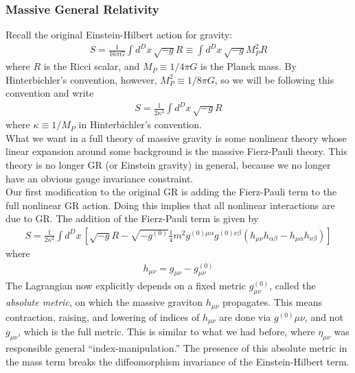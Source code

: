 \documentclass{book}
\theoremstyle{definition}
\newcommand{\f}[2]{\frac{#1}{#2}}
\newcommand{\lp}{\left(}
\newcommand{\rp}{\right)}
\newcommand{\lb}{\left[}
\newcommand{\rb}{\right]}
\begin{document}
\subsubsection{Massive General Relativity}



Recall the original Einstein-Hilbert action for gravity:
\begin{align}
S = \f{1}{16\pi G}\int d^Dx\, \sqrt{-g}R\equiv \int d^Dx\, \sqrt{-g}M_P^2R
\end{align}
where $R$ is the Ricci scalar, and $M_P \equiv 1/4\pi G$ is the Planck mass. By Hinterbichler's convention, however, $M_P^2 \equiv 1/8\pi G$, so we will be following this convention and write
\begin{align}
S = \f{1}{2\kappa^2}\int d^Dx\, \sqrt{-g}R
\end{align}
where $\kappa  \equiv 1/M_P$ in Hinterbichler's convention. \\

What we want in a full theory of massive gravity is some nonlinear theory whose linear expansion around some background is the massive Fierz-Pauli theory. This theory is no longer GR (or Einstein gravity) in general, because we no longer have an obvious gauge invariance constraint.\\

Our first modification to the original GR is adding the Fierz-Pauli term to the full nonlinear GR action. Doing this implies that all nonlinear interactions are due to GR. The addition of the Fierz-Pauli term is given by
\begin{align}\label{massive}
\boxed{S = \f{1}{2\kappa^2}\int d^Dx\, \lb \sqrt{-g}R - \sqrt{-g^{(0)}}\f{1}{4}m^2 g^{(0)\mu\alpha}g^{(0)\nu\beta}\lp h_{\mu\nu}h_{\alpha\beta} - h_{\mu\alpha}h_{\nu\beta} \rp \rb}
\end{align}
where 
\begin{align}
\boxed{h_{\mu\nu} = g_{\mu\nu} - g^{(0)}_{\mu\nu}}
\end{align}
The Lagrangian now explicitly depends on a fixed metric $g^{(0)}_{\mu\nu}$, called the \textit{absolute metric}, on which the massive graviton $h_{\mu\nu}$ propagates. This means contraction, raising, and lowering of indices of $h_{\mu\nu}$ are done via $g^{(0)}_{}\mu\nu$, and not $g_{\mu\nu}$, which is the full metric. This is similar to what we had before, where $\eta_{\mu\nu}$ was responsible general ``index-manipulation.'' The presence of this absolute metric in the mass term breaks the diffeomorphism invariance of the Einstein-Hilbert term. \\
\end{document}
